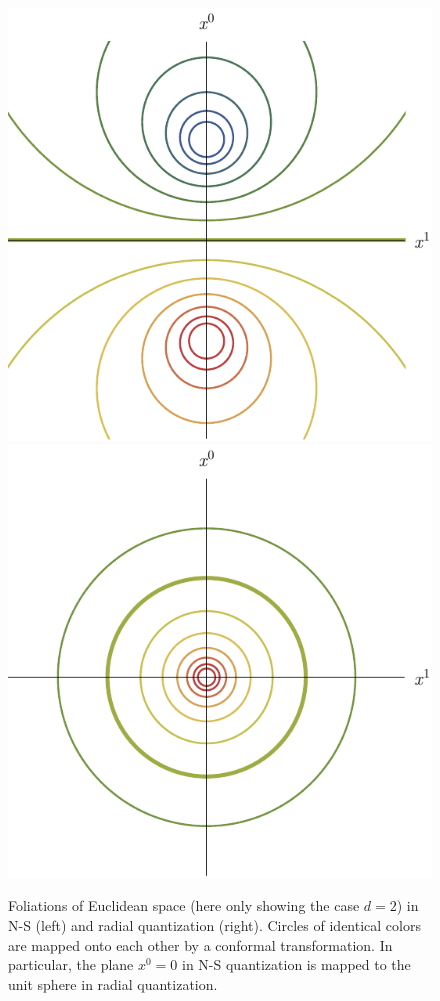 \documentclass[a4paper,12pt]{article}
\numberwithin{equation}{section}
\begin{document}
\begin{figure}
	\includegraphics[width=0.48\linewidth]{figures/NSfoliation.pdf}
	\hfill
	\includegraphics[width=0.48\linewidth]{figures/Rfoliation.pdf}
	\caption{Foliations of Euclidean space
	(here only showing the case $d = 2$) 
	in N-S (left) and radial quantization (right).
	Circles of identical colors are mapped onto each other
	by a conformal transformation. In particular, the plane 
	$x^0 = 0$ in N-S quantization is mapped to the unit sphere 
	in radial quantization.}
	\label{fig:foliations}
\end{figure}
\end{document}
